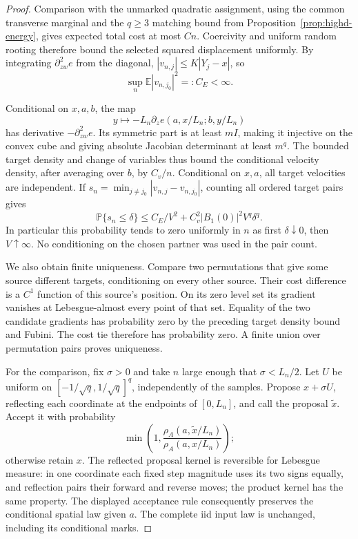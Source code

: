 \documentclass[11pt,reqno]{amsart}
\theoremstyle{definition}
\theoremstyle{remark}
\numberwithin{equation}{section}
\newcommand{\E}{\mathbb E}
\newcommand{\Pp}{\mathbb P}
\begin{document}
\begin{proof}
Comparison with the unmarked quadratic assignment, using the
common transverse marginal and the \(q\ge3\) matching bound from
Proposition~\ref{prop:highd-energy}, gives expected total cost
at most \(Cn\). Coercivity and uniform random rooting therefore
bound the selected squared displacement uniformly. By integrating
\(\partial_{zw}^2 e\) from the diagonal,
\(|v_{n,j}|\le K|Y_j-x|\), so
\begin{equation}
 \sup_n\E|v_{n,j_0}|^2=:C_E<\infty.
 \label{eq:highd-curved-root-gradient-moment}
\end{equation}

Conditional on \(x,a,b\), the map
\[
 y\longmapsto-L_n\partial_z e(a,x/L_n;b,y/L_n)
\]
has derivative \(-\partial_{zw}^2e\). Its symmetric part is at
least \(mI\), making it injective on the convex cube and giving
absolute Jacobian determinant at least \(m^q\). The bounded
target density and change of variables thus bound the conditional
velocity density, after averaging over \(b\), by \(C_v/n\).
Conditional on \(x,a\), all target velocities are independent.
If \(s_n=\min_{j\ne j_0}|v_{n,j}-v_{n,j_0}|\), counting all
ordered target pairs gives
\begin{equation}
 \Pp\{s_n\le\delta\}
 \le C_E/V^2+C_v^2|B_1(0)|^2 V^q\delta^q .
 \label{eq:highd-curved-gradient-separation}
\end{equation}
In particular this probability tends to zero uniformly in \(n\)
as first \(\delta\downarrow0\), then \(V\uparrow\infty\).
No conditioning on the chosen partner was used in the pair count.

We also obtain finite uniqueness. Compare two permutations that
give some source different targets, conditioning on every other
source. Their cost difference is a \(C^1\) function of this
source's position. On its zero level set its gradient vanishes
at Lebesgue-almost every point of that set. Equality of the two
candidate gradients has probability zero by the preceding target
density bound and Fubini. The cost tie therefore has probability
zero. A finite union over permutation pairs proves uniqueness.

For the comparison, fix \(\sigma>0\) and take \(n\) large enough
that \(\sigma<L_n/2\). Let \(U\) be uniform on
\([-1/\sqrt q,1/\sqrt q]^q\), independently of the samples.
Propose \(x+\sigma U\), reflecting each coordinate at the endpoints
of \([0,L_n]\), and call the proposal \(\widetilde x\). Accept it
with probability
\[
 \min\left(1,\frac{\rho_A(a,\widetilde x/L_n)}
                       {\rho_A(a,x/L_n)}\right);
\]
otherwise retain \(x\). The reflected proposal kernel is reversible
for Lebesgue measure: in one coordinate each fixed step magnitude
uses its two signs equally, and reflection pairs their forward and
reverse moves; the product kernel has the same property.
The displayed acceptance rule consequently preserves the
conditional spatial law given \(a\). The complete iid input law
is unchanged, including its conditional marks.


\end{proof}
\end{document}
